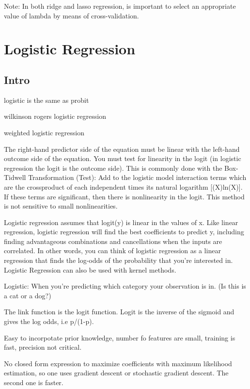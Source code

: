 \documentclass[]{book}
\begin{document}
Note: In both ridge and lasso regression, is important to select an
appropriate value of lambda by means of cross-validation.

\section{Logistic Regression}\label{logistic-regression}

\subsection{Intro}\label{intro-1}

logistic is the same as probit

wilkinson rogers logistic regression

weighted logistic regression

The right-hand predictor side of the equation must be linear with the
left-hand outcome side of the equation. You must test for linearity in
the logit (in logistic regression the logit is the outcome side). This
is commonly done with the Box-Tidwell Transformation (Test): Add to the
logistic model interaction terms which are the crossproduct of each
independent times its natural logarithm {[}(X)ln(X){]}. If these terms
are significant, then there is nonlinearity in the logit. This method is
not sensitive to small nonlinearities.

Logistic regression assumes that logit(y) is linear in the values of x.
Like linear regression, logistic regression will find the best
coefficients to predict y, including finding advantageous combinations
and cancellations when the inputs are correlated. In other words, you
can think of logistic regression as a linear regression that finds the
log-odds of the probability that you're interested in. Logistic
Regression can also be used with kernel methods.

Logistic: When you're predicting which category your observation is in.
(Is this is a cat or a dog?)

The link function is the logit function. Logit is the inverse of the
sigmoid and gives the log odds, i.e p/(1-p).

Easy to incorpotate prior knowledge, number fo features are small,
training is fast, precision not critical.

No closed form expression to maximize coefficients with maximum
likelihood estimation, so one uses gradient descent or stochastic
gradient descent. The second one is faster.
\end{document}
